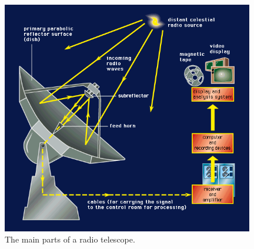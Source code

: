 \begin{figure}[H]
    \centering
    \includegraphics[width=0.98\textwidth]{Astronomy/radio_telescope.png}
    \caption{The main parts of a radio telescope.}
    \label{fig:radio_telescope}
\end{figure}


